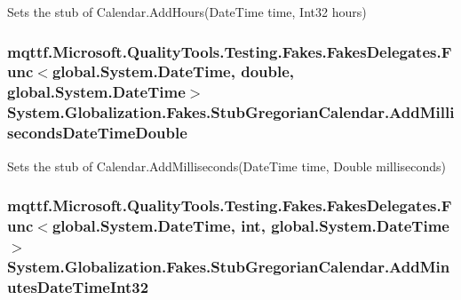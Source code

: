 Sets the stub of Calendar.\-Add\-Hours(\-Date\-Time time, Int32 hours)

\hypertarget{class_system_1_1_globalization_1_1_fakes_1_1_stub_gregorian_calendar_ac79b8020ff5f762ca9af1fe6b79f3c2d}{
\subsubsection[{Add\-Milliseconds\-Date\-Time\-Double}]{\setlength{\rightskip}{0pt plus 5cm}mqttf.\-Microsoft.\-Quality\-Tools.\-Testing.\-Fakes.\-Fakes\-Delegates.\-Func$<$global.\-System.\-Date\-Time, double, global.\-System.\-Date\-Time$>$ System.\-Globalization.\-Fakes.\-Stub\-Gregorian\-Calendar.\-Add\-Milliseconds\-Date\-Time\-Double}}\label{class_system_1_1_globalization_1_1_fakes_1_1_stub_gregorian_calendar_ac79b8020ff5f762ca9af1fe6b79f3c2d}


Sets the stub of Calendar.\-Add\-Milliseconds(\-Date\-Time time, Double milliseconds)

\hypertarget{class_system_1_1_globalization_1_1_fakes_1_1_stub_gregorian_calendar_ac3cde36364fe8c9779093e3f42ef032f}{
\subsubsection[{Add\-Minutes\-Date\-Time\-Int32}]{\setlength{\rightskip}{0pt plus 5cm}mqttf.\-Microsoft.\-Quality\-Tools.\-Testing.\-Fakes.\-Fakes\-Delegates.\-Func$<$global.\-System.\-Date\-Time, int, global.\-System.\-Date\-Time$>$ System.\-Globalization.\-Fakes.\-Stub\-Gregorian\-Calendar.\-Add\-Minutes\-Date\-Time\-Int32}}\label{class_system_1_1_globalization_1_1_fakes_1_1_stub_gregorian_calendar_ac3cde36364fe8c9779093e3f42ef032f}


